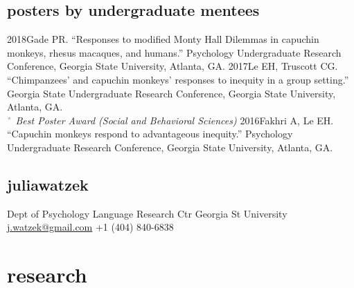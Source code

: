 \documentclass[]{friggeri-cv}
\begin{document}

\subsection{posters by undergraduate mentees}

\begin{entrylist2}
  \entrytwo
    {2018}{Gade PR. ``Responses to modified Monty Hall Dilemmas in capuchin monkeys, rhesus macaques, and humans.'' Psychology Undergraduate Research Conference, Georgia State University, Atlanta, GA.}
  \entrytwo
    {2017}{Le EH, Truscott CG. ``Chimpanzees' and capuchin monkeys' responses to inequity in a group setting.'' Georgia State Undergraduate Research Conference, Georgia State University, Atlanta, GA.\\
    {\quad\small{} $\color{lightgray} {}^\star$ \emph{\color{lightgray} Best Poster Award (Social and Behavioral Sciences)}}}
  \entrytwo
    {2016}{Fakhri A, Le EH. ``Capuchin monkeys respond to advantageous inequity.'' Psychology Undergraduate Research Conference, Georgia State University, Atlanta, GA.}
\end{entrylist2}



\begin{aside}
  \section{{\normalfont julia}watzek}
    Dept of Psychology
    Language Research Ctr
    Georgia St University
    ~
    \href{mailto:j.watzek@gmail.com}{j.watzek@gmail.com}
    +1 (404) 840-6838
\end{aside}


\section{research}
\end{document}
